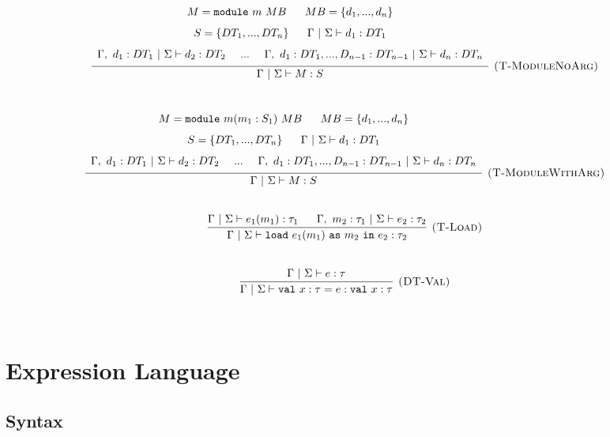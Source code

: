 \documentclass{llncs}
\newcommand{\keyw}[1]{\mathtt{#1}~}
\begin{document}
\[\begin{array}{c}
\infer[\textsc{(T-ModuleNoArg)}]
  {\Gamma~|~\Sigma \vdash M : S}
  {\def\arraystretch{1.6}
  \begin{array}{c}
M = \keyw{module} m~MB~~~~~MB = \{d_1, ..., d_n\}\\
S = \{DT_1, ..., DT_n\}~~~~~\Gamma~|~\Sigma \vdash d_1 : DT_1 \\
\Gamma,~d_1 : DT_1~|~\Sigma \vdash d_2 : DT_2~~~~...~~~~\Gamma,~d_1 : DT_1, ..., D_{n-1} : DT_{n-1} ~|~\Sigma \vdash d_n : DT_n
  \end{array}}\\[5ex]

\infer[\textsc{(T-ModuleWithArg)}]
  {\Gamma~|~\Sigma \vdash M : S}
  {\def\arraystretch{1.6}
  \begin{array}{c}
M = \keyw{module} m(m_1 : S_1)~MB~~~~~MB = \{d_1, ..., d_n\}\\
S = \{DT_1, ..., DT_n\}~~~~~\Gamma~|~\Sigma \vdash d_1 : DT_1 \\
\Gamma,~d_1 : DT_1~|~\Sigma \vdash d_2 : DT_2~~~~...~~~~\Gamma,~d_1 : DT_1, ..., D_{n-1} : DT_{n-1} ~|~\Sigma \vdash d_n : DT_n
  \end{array}}\\[5ex]
  
\infer[\textsc{(T-Load)}]
  {\Gamma~|~\Sigma \vdash \keyw{load} e_1(m_1)~\keyw{as} m_2~\keyw{in} e_2 : \tau_2}
  {\Gamma~|~\Sigma \vdash e_1(m_1) : \tau_1~~~~~\Gamma,~m_2 : \tau_1~|~\Sigma \vdash e_2 : \tau_2}\\[5ex]

\infer[\textsc{(DT-Val)}]
  {\Gamma~|~\Sigma \vdash \keyw{val} x : \tau = e : \keyw{val} x : \tau}
  {\Gamma~|~\Sigma \vdash e : \tau}\\[5ex]

\end{array}
\]

\newpage

\section{Expression Language}

\subsection{Syntax}
\end{document}
